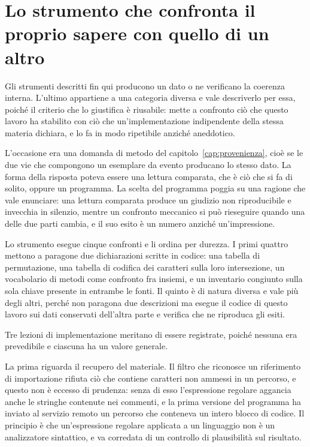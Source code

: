 \section{Lo strumento che confronta il proprio sapere con quello di un altro}

Gli strumenti descritti fin qui producono un dato o ne verificano la coerenza interna. L'ultimo appartiene a una categoria diversa e vale descriverlo per essa, poiché il criterio che lo giustifica è riusabile: mette a confronto ciò che questo lavoro ha stabilito con ciò che un'implementazione indipendente della stessa materia dichiara, e lo fa in modo ripetibile anziché aneddotico.

L'occasione era una domanda di metodo del capitolo~\ref{cap:provenienza}, cioè se le due vie che compongono un esemplare da evento producano lo stesso dato. La forma della risposta poteva essere una lettura comparata, che è ciò che si fa di solito, oppure un programma. La scelta del programma poggia su una ragione che vale enunciare: una lettura comparata produce un giudizio non riproducibile e invecchia in silenzio, mentre un confronto meccanico si può rieseguire quando una delle due parti cambia, e il suo esito è un numero anziché un'impressione.

Lo strumento esegue cinque confronti e li ordina per durezza. I primi quattro mettono a paragone due dichiarazioni scritte in codice: una tabella di permutazione, una tabella di codifica dei caratteri sulla loro intersezione, un vocabolario di metodi come confronto fra insiemi, e un inventario congiunto sulla sola chiave presente in entrambe le fonti. Il quinto è di natura diversa e vale più degli altri, perché non paragona due descrizioni ma esegue il codice di questo lavoro sui dati conservati dell'altra parte e verifica che ne riproduca gli esiti.

Tre lezioni di implementazione meritano di essere registrate, poiché nessuna era prevedibile e ciascuna ha un valore generale.

La prima riguarda il recupero del materiale. Il filtro che riconosce un riferimento di importazione rifiuta ciò che contiene caratteri non ammessi in un percorso, e questo non è eccesso di prudenza: senza di esso l'espressione regolare aggancia anche le stringhe contenute nei commenti, e la prima versione del programma ha inviato al servizio remoto un percorso che conteneva un intero blocco di codice. Il principio è che un'espressione regolare applicata a un linguaggio non è un analizzatore sintattico, e va corredata di un controllo di plausibilità sul risultato.

